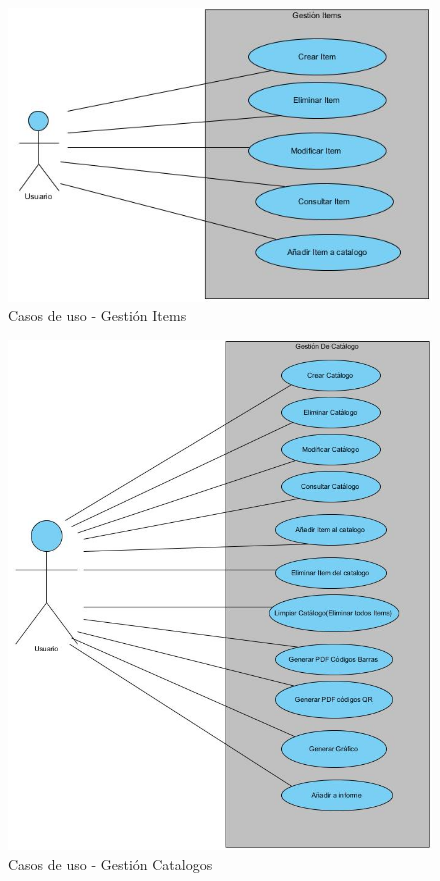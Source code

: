 \documentclass[a4paper,11pt]{book}
\begin{document}
\begin{figure}[htbp]  
\centering 
\includegraphics[scale=0.50]{imagenes/casosUso/gestionItem.jpg}
\caption{ Casos de uso - Gestión Items  }  
\end{figure}

\begin{figure}[H] 
\centering 
\includegraphics[scale=0.50]{imagenes/casosUso/gestionCatalogo.jpg}
\caption{ Casos de uso - Gestión Catalogos  }  
\end{figure}
\end{document}
